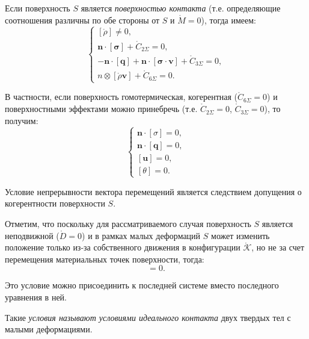 
Если поверхность $S$ является \textit{поверхностью контакта} (т.е. определяющие соотношения различны по обе стороны от $S$ и $\mathring{M} = 0$), тогда имеем:
\begin{equation}
	\begin{cases}
		[\mathring{\rho}] \not= 0, \\
		\mathbf{n} \cdot [\mathbf{\sigma}] + \mathring{C}_{2\Sigma} = 0, \\
		- \mathbf{n} \cdot [\mathbf{q}] + \mathbf{n} \cdot [\mathbf{\sigma} \cdot \mathbf{v}] + \mathring{C}_{3\Sigma} = 0, \\
		n \otimes [\mathring{\rho} \mathbf{v}] + \mathring{C}_{6\Sigma} = 0.
	\end{cases}
\end{equation}

В частности, если поверхность гомотермическая, когерентная ($\mathring{C}_{6\Sigma} = 0$) и поверхностными эффектами можно принебречь (т.е. $\mathring{C}_{2\Sigma} = 0$, $\mathring{C}_{3\Sigma} = 0$), то получим:
\begin{equation}
	\begin{cases}
		\mathbf{n} \cdot [\sigma] = 0, \\
		\mathbf{n} \cdot [\mathbf{q}] = 0, \\
		[\mathbf{u}] = 0, \\
		[\theta] = 0.
	\end{cases}
\end{equation}

Условие непрерывности вектора перемещений является следствием допущения о когерентности поверхности $S$.

Отметим, что поскольку для рассматриваемого случая поверхность $S$ является неподвижной ($\mathring{D} = 0$) и в рамках малых деформаций $S$ может изменить положение только из-за собственного движения в конфигурации $\mathring{\mathcal{K}}$, но не за счет перемещения материальных точек поверхности, тогда:
\begin{equation}
	[\mathbf{v}] = 0.
\end{equation} 

Это условие можно присоединить к последней системе вместо последного уравнения в ней. 

Такие \textit{условия называют условиями идеального контакта} двух твердых тел с малыми деформациями. 

